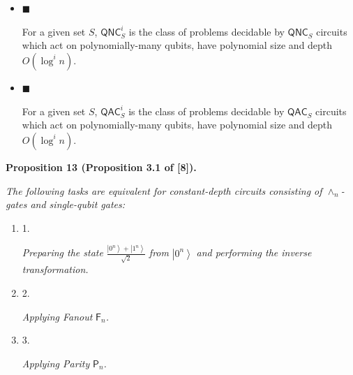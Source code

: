 \documentclass[10pt,a4paper]{article}
\begin{document}
\begin{itemize}


\item[] 
$\blacksquare$ 


For a given set $S$, ${\mathsf{QNC}}_{S}^{i}$ is the class of problems decidable by ${\mathsf{QNC}}_{S}$ circuits which act on polynomially-many qubits, have polynomial size and depth $O(\log^{i}n)$.\par





\item[] 
$\blacksquare$ 


For a given set $S$, ${\mathsf{QAC}}_{S}^{i}$ is the class of problems decidable by ${\mathsf{QAC}}_{S}$ circuits which act on polynomially-many qubits, have polynomial size and depth $O(\log^{i}n)$.\par





\end{itemize}





\par\medskip\noindent\textbf{
\textbf{Proposition 13}\textbf{ }(Proposition 3.1 of [8])\textbf{.}
}\par



\emph{The following tasks are equivalent for constant-depth circuits consisting of $\wedge_{n}$-gates and single-qubit gates:}\par


\begin{enumerate}


\item[] 
1. 


\emph{Preparing the state }$\frac{\left|0^{n}\right\rangle+\left|1^{n}\right\rangle}{\sqrt{2}}$\emph{ from }$\left|0^{n}\right\rangle$\emph{ and performing the inverse transformation.}\par





\item[] 
2. 


\emph{Applying Fanout }$\mathsf{F}_{n}$\emph{.}\par





\item[] 
3. 


\emph{Applying Parity }$\mathsf{P}_{n}$\emph{.}\par





\end{enumerate}
\end{document}
